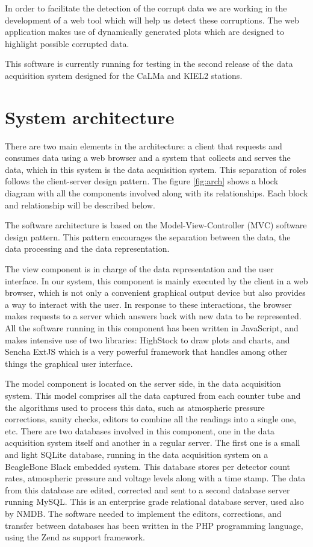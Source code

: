 \documentclass[a4paper]{jpconf}
\begin{document}
In order to facilitate the detection of the corrupt data we are working in the
development of a web tool which will help us detect these corruptions. The web
application makes use of dynamically generated plots which are designed to
highlight possible corrupted data.

This software is currently running for testing in the second release of the data
acquisition system\cite{Garcia2014} designed for the CaLMa\cite{Medina2013} and
KIEL2 stations.


\section{System architecture}

There are two main elements in the architecture: a client that requests and
consumes data using a web browser and a system that collects and serves the
data, which in this system is the data acquisition system. This separation of
roles follows the client-server design pattern\cite{wiki:ClientServer}. The
figure \ref{fig:arch} shows a block diagram with all the components involved
along with its relationships. Each block and relationship will be described
below.

The software architecture is based on the Model-View-Controller (MVC) software
design pattern\cite{wiki:MVC}. This pattern encourages the separation between
the data, the data processing and the data representation. 

The view component is in charge of the data representation and the user
interface. In our system, this component is mainly executed by the client in a
web browser, which is not only a convenient graphical output device but also
provides a way to interact with the user. In response to these interactions, the
browser makes requests to a server which answers back with new data to be
represented. All the software running in this component has been written in
JavaScript, and makes intensive use of two libraries:
HighStock\cite{web:highstock} to draw plots and charts, and Sencha
ExtJS\cite{web:extjs} which is a very powerful framework that handles among
other things the graphical user interface.

The model component is located on the server side, in the data acquisition
system. This model comprises all the data captured from each counter tube and
the algorithms used to process this data, such as atmospheric pressure
corrections, sanity checks, editors to combine all the readings into a single
one, etc. There are two databases involved in this component, one in the data
acquisition system itself and another in a regular server. The first one is a
small and light SQLite database, running in the data acquisition system on a
BeagleBone Black embedded system\cite{Garcia2014}. This database stores per
detector count rates, atmospheric pressure and voltage levels along with a time
stamp. The data from this database are edited, corrected and sent to a second
database server running MySQL\cite{web:mysql}. This is an enterprise grade
relational database server, used also by NMDB. The software needed to implement
the editors, corrections, and transfer between databases has been written in the
PHP programming language, using the Zend\cite{web:zend} as support framework.
\end{document}
